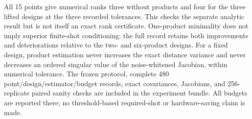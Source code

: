All 15 points give numerical ranks three without products and four for the
three lifted designs at the three recorded tolerances. This checks the
separate analytic result but is not itself an exact rank certificate.
One-product minimality does not imply superior finite-shot conditioning:
the full record retains both improvements and deteriorations relative to
the two- and six-product designs. For a fixed design, product estimation
never increases the exact distance variance and never decreases an ordered
singular value of the noise-whitened Jacobian, within numerical tolerance.
The frozen protocol, complete 480 point/design/estimator/budget records,
exact covariances, Jacobians, and 256-replicate paired sanity checks are
included in the experiment bundle. All budgets are reported there; no
threshold-based required-shot or hardware-saving claim is made.
